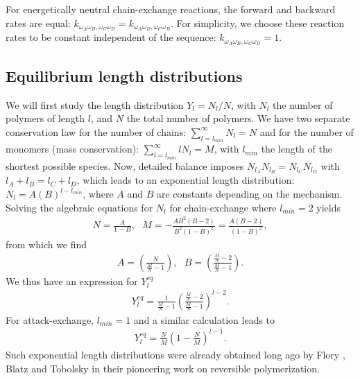 \documentclass[
	amsmath,
	amssymb,
	a4paper,
	aip,		%
	jcp,		%
	reprint, twocolumn  %
	fleqn,
	showpacs,
	floatfix
]{revtex4-1}
\begin{document}
For energetically neutral chain-exchange reactions, the forward and backward rates are equal:
$k_{\omega_{A} \omega_{B}, \omega_{C} \omega_{D}} =k_{\omega_{A} \omega_{D}, \omega_{C} \omega_{B}}$.
For simplicity, we choose these reaction rates to be constant independent of the sequence: 
$k_{\omega_{A} \omega_{B}, \omega_{C} \omega_{D}}=1$. 

\subsection{Equilibrium length distributions}

We will first study the length distribution $Y_{l}=N_{l}/N$, with $N_{l}$ the number of polymers of length $l$, and $N$ the total number of polymers. 
We have two separate conservation law for the number 
of chains: $\sum^{\infty}_{l=l_{min}} N_{l} = N$ and for the number of monomers (mass conservation): $\sum^{\infty}_{l=l_{min}} l N_{l}=
 M$, 
with $l_{min}$ the length of the shortest possible species. 
Now, detailed balance imposes $N_{l_{A}} N_{l_{B}} = N_{l_{C}} N_{l_{D}}$ with $l_{A}+l_{B}=l_{C}+l_{D}$, which leads to 
an exponential length distribution: $N_{l}=A (B)^{l-l_{min}}$, where $A$ and $B$ are constants depending on the mechanism.
Solving the algebraic equations for $N_{l}$ for chain-exchange where $l_{min}=2$ yields
\begin{equation}
	\begin{split}
N=\frac{A}{1-B}, \ \ \ M= - \frac{A B^{2} (B-2)}{B^{2} (1-B)^{2}}=\frac{A (B-2)}{(1-B)^{2}},
\label{ZM}
\end{split} 
\end{equation}
from which we find
 \begin{equation}
	\begin{split}
A= \left(\frac{N}{\frac{M}{N}-1} \right), \ \ \ B=\left(\frac{\frac{M}{N}-2}{{\frac{M}{N}-1}} \right).
\label{AB}
\end{split} 
\end{equation}
We thus have an expression for $Y^{eq}_{l}$
\begin{equation}
	\begin{split}
Y^{eq}_{l} = \frac{1}{\frac{M}{N}-1}  \left(\frac{\frac{M}{N}-2}{{\frac{M}{N}-1}} \right)^{l-2}.
\label{Yl}
\end{split} 
\end{equation}
For attack-exchange, $l_{min}=1$ and a similar calculation leads to
\begin{equation}
	\begin{split}
Y^{eq}_{l} = \frac{N}{M} \left( 1- \frac{N}{M} \right)^{l-1}.
\label{Yl2}
\end{split} 
\end{equation}
Such exponential length distributions were already obtained long ago by Flory \citep{Flory1944}, Blatz and Tobolsky \cite{Blatz1945} 
in their pioneering work on reversible polymerization.
\end{document}
